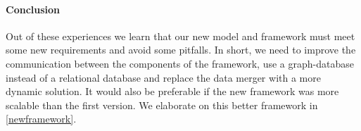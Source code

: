 \paragraph{Conclusion} Out of these experiences we learn that our new model and framework must meet some new requirements and avoid some pitfalls. In short, we need to improve the communication between the components of the framework, use a graph-database instead of a relational database and replace the data merger with a more dynamic solution. It would also be preferable if the new framework was more scalable than the first version. We elaborate on this better framework in \autoref{newframework}.